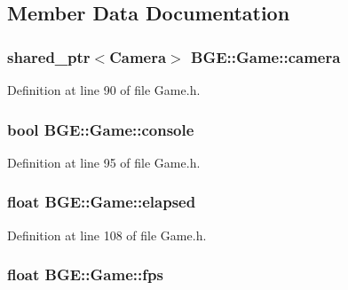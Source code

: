 \subsection{Member Data Documentation}
\hypertarget{class_b_g_e_1_1_game_a529f329238da26b1bc8199f46edb6754}{
\subsubsection[{camera}]{\setlength{\rightskip}{0pt plus 5cm}shared\-\_\-ptr$<${\bf Camera}$>$ B\-G\-E\-::\-Game\-::camera}}\label{class_b_g_e_1_1_game_a529f329238da26b1bc8199f46edb6754}


Definition at line 90 of file Game.\-h.

\hypertarget{class_b_g_e_1_1_game_ae6c23ffff29b83b65a253788e4e8a735}{
\subsubsection[{console}]{\setlength{\rightskip}{0pt plus 5cm}bool B\-G\-E\-::\-Game\-::console}}\label{class_b_g_e_1_1_game_ae6c23ffff29b83b65a253788e4e8a735}


Definition at line 95 of file Game.\-h.

\hypertarget{class_b_g_e_1_1_game_aedae810ac31a45184e38a24b643d1825}{
\subsubsection[{elapsed}]{\setlength{\rightskip}{0pt plus 5cm}float B\-G\-E\-::\-Game\-::elapsed}}\label{class_b_g_e_1_1_game_aedae810ac31a45184e38a24b643d1825}


Definition at line 108 of file Game.\-h.

\hypertarget{class_b_g_e_1_1_game_a6827ac220d27fc4be181235f39f148c2}{
\subsubsection[{fps}]{\setlength{\rightskip}{0pt plus 5cm}float B\-G\-E\-::\-Game\-::fps}}\label{class_b_g_e_1_1_game_a6827ac220d27fc4be181235f39f148c2}


